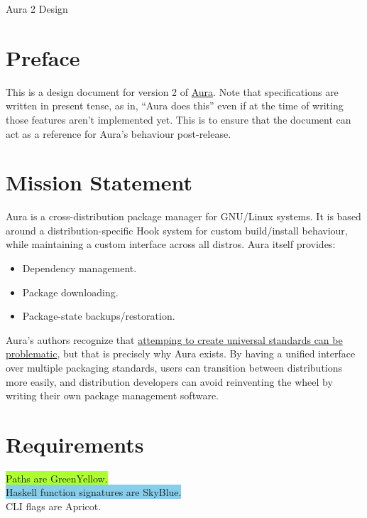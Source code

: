 \documentclass{article}
\begin{document}

\tableofcontents
\clearpage

Aura 2 Design

\section{Preface}\label{preface}

This is a design document for version 2 of
\href{https://github.com/fosskers/aura}{Aura}. Note that specifications
are written in present tense, as in, ``Aura does this'' even if at the
time of writing those features aren't implemented yet. This is to ensure
that the document can act as a reference for Aura's behaviour
post-release.

\section{Mission Statement}\label{mission-statement}

Aura is a cross-distribution package manager for GNU/Linux systems. It
is based around a distribution-specific Hook system for custom
build/install behaviour, while maintaining a custom interface across all
distros. Aura itself provides:

\begin{itemize}
\itemsep1pt\parskip0pt
\item
  Dependency management.
\item
  Package downloading.
\item
  Package-state backups/restoration.
\end{itemize}

Aura's authors recognize that \href{http://www.xkcd.com/927/}{attemping
to create universal standards can be problematic}, but that is precisely
why Aura exists. By having a unified interface over multiple packaging
standards, users can transition between distributions more easily, and
distribution developers can avoid reinventing the wheel by writing their
own package management software.

\section{Requirements}\label{requirements}
\colorbox{GreenYellow}{Paths are GreenYellow.}\\
\colorbox{SkyBlue}{Haskell function signatures are SkyBlue.}\\
\colorbox{Apricot}{CLI flags are Apricot.}
\end{document}
